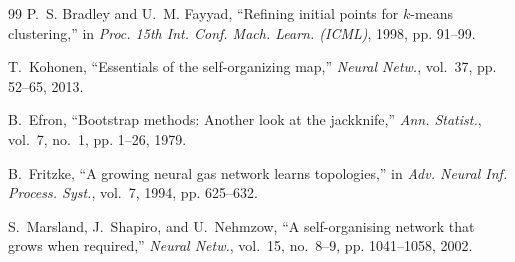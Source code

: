 \documentclass[journal]{IEEEtran}
\begin{document}
\begin{thebibliography}{99}
P.~S. Bradley and U.~M. Fayyad, ``Refining initial points for $k$-means clustering,'' in \emph{Proc. 15th Int. Conf. Mach. Learn. (ICML)}, 1998, pp. 91--99.

T.~Kohonen, ``Essentials of the self-organizing map,'' \emph{Neural Netw.}, vol.~37, pp. 52--65, 2013.

B.~Efron, ``Bootstrap methods: Another look at the jackknife,'' \emph{Ann. Statist.}, vol.~7, no.~1, pp. 1--26, 1979.

B.~Fritzke, ``A growing neural gas network learns topologies,'' in \emph{Adv. Neural Inf. Process. Syst.}, vol.~7, 1994, pp. 625--632.

S.~Marsland, J.~Shapiro, and U.~Nehmzow, ``A self-organising network that grows when required,'' \emph{Neural Netw.}, vol.~15, no.~8--9, pp. 1041--1058, 2002.

\end{thebibliography}
\end{document}

